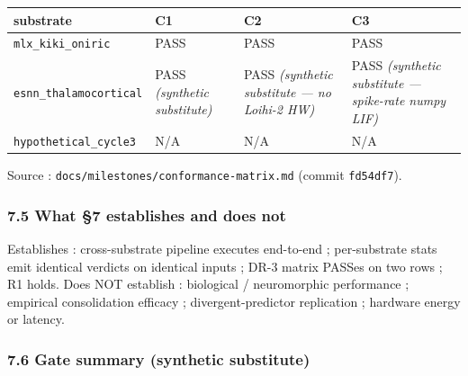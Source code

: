 \documentclass[
]{article}
\newcounter{none} %
\begin{document}
{\def\LTcaptype{none} %
\begin{longtable}[]{@{}
  >{\raggedright\arraybackslash}p{}
  >{\raggedright\arraybackslash}p{}
  >{\raggedright\arraybackslash}p{}
  >{\raggedright\arraybackslash}p{}@{}}
\toprule\noalign{}
\begin{minipage}[b]{\linewidth}\raggedright
substrate
\end{minipage} & \begin{minipage}[b]{\linewidth}\raggedright
C1
\end{minipage} & \begin{minipage}[b]{\linewidth}\raggedright
C2
\end{minipage} & \begin{minipage}[b]{\linewidth}\raggedright
C3
\end{minipage} \\
\midrule\noalign{}
\endhead
\bottomrule\noalign{}
\endlastfoot
\texttt{mlx\_kiki\_oniric} & PASS & PASS & PASS \\
\texttt{esnn\_thalamocortical} & PASS \emph{(synthetic substitute)} &
PASS \emph{(synthetic substitute --- no Loihi-2 HW)} & PASS
\emph{(synthetic substitute --- spike-rate numpy LIF)} \\
\texttt{hypothetical\_cycle3} & N/A & N/A & N/A \\
\end{longtable}
}

Source : \texttt{docs/milestones/conformance-matrix.md} (commit
\texttt{fd54df7}).

\subsubsection{7.5 What §7 establishes and does
not}\label{what-7-establishes-and-does-not}

Establishes : cross-substrate pipeline executes end-to-end ;
per-substrate stats emit identical verdicts on identical inputs ; DR-3
matrix PASSes on two rows ; R1 holds. Does NOT establish : biological /
neuromorphic performance ; empirical consolidation efficacy ;
divergent-predictor replication ; hardware energy or latency.

\subsubsection{7.6 Gate summary (synthetic
substitute)}\label{gate-summary-synthetic-substitute}
\end{document}
